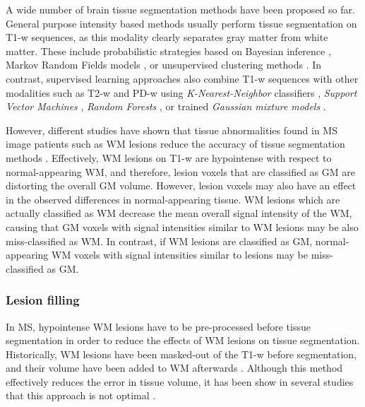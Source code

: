 A wide number of brain tissue segmentation methods have been proposed so far. General purpose intensity based methods usually perform tissue segmentation on T1-w sequences, as this modality clearly separates gray matter from white matter. These include probabilistic strategies based on Bayesian inference \cite{Ashburner2005,Marroquin2002, Roy2012,Shattuck2001}, Markov Random Fields models \cite{Bricq2008, Tohka2010, Zhang2001}, or unsupervised clustering methods \cite{Caldairou2011, Pham2001}. In contrast, supervised learning approaches also combine T1-w sequences with other modalities such as T2-w and PD-w using \textit{K-Nearest-Neighbor} classifiers \cite{deBoer2009,Vrooman2013}, \textit{Support Vector Machines} \cite{Akselrod2006,Opbroek2013}, \textit{Random Forests} \cite{yi2009,Mahapatra2014}, or trained \textit{Gaussian mixture models} \cite{Rajchl2015}. 

However, different studies have shown that tissue abnormalities found in MS image patients such as WM lesions reduce the accuracy of tissue segmentation methods \cite{Battaglini2012, Chard2010}. Effectively, WM lesions on T1-w are hypointense with respect to normal-appearing WM, and  therefore, lesion voxels that are classified as GM are distorting the overall GM volume. However, lesion voxels may also have an effect in the observed differences in normal-appearing tissue. WM lesions which are actually classified as WM decrease the mean overall signal intensity of the WM, causing that GM voxels with signal intensities similar to WM lesions may be also miss-classified as WM.  In contrast, if WM lesions are classified as GM, normal-appearing WM voxels with signal intensities similar to lesions may be miss-classified as GM. 
 
\subsubsection{Lesion filling}
\label{subsec:lesion_filling}
In MS, hypointense WM lesions have to be pre-processed before tissue segmentation in order to reduce the effects of WM lesions on tissue segmentation. Historically, WM lesions have been masked-out of the T1-w before segmentation, and their volume have been added to WM afterwards \cite{Chard2002}. Although this method effectively reduces the error in tissue volume, it has been show in several studies that this approach is not optimal \cite{Battaglini2012, Chard2010}. 

